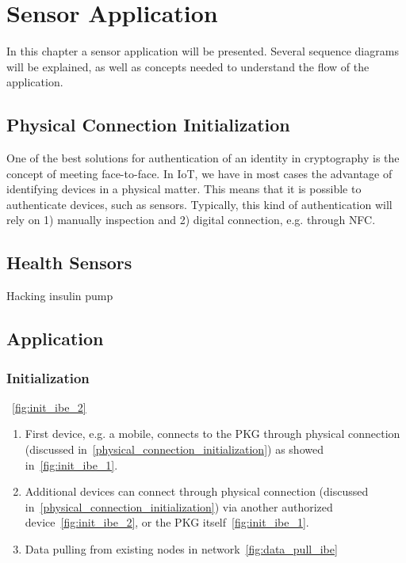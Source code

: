 \chapter{Sensor Application}\label{sensor-application}
In this chapter a sensor application will be presented. 
Several sequence diagrams will be explained, as well as concepts needed to understand the flow of the application. 

\section{Physical Connection Initialization}\label{physical_connection_initialization}
One of the best solutions for authentication of an identity in cryptography is the concept of meeting face-to-face. 
In \gls{IoT}, we have in most cases the advantage of identifying devices in a physical matter. 
This means that it is possible to authenticate devices, such as sensors. 
Typically, this kind of authentication will rely on 1) manually inspection and 2) digital connection, e.g. through \gls{NFC}.

\section{Health Sensors}
Hacking insulin pump~\cite{radcliffe2011hacking}

\section{Application}


\subsection{Initialization}
~\autoref{fig:init_ibe_2}

\begin{enumerate}
  \item First device, e.g. a mobile, connects to the \gls{PKG} through physical connection (discussed in~\autoref{physical_connection_initialization}) as showed in~\autoref{fig:init_ibe_1}.
  \item Additional devices can connect through physical connection (discussed in~\autoref{physical_connection_initialization}) via another authorized device~\autoref{fig:init_ibe_2}, or the \gls{PKG} itself~\autoref{fig:init_ibe_1}. 
  \item Data pulling from existing nodes in network~\autoref{fig:data_pull_ibe}
\end{enumerate}


